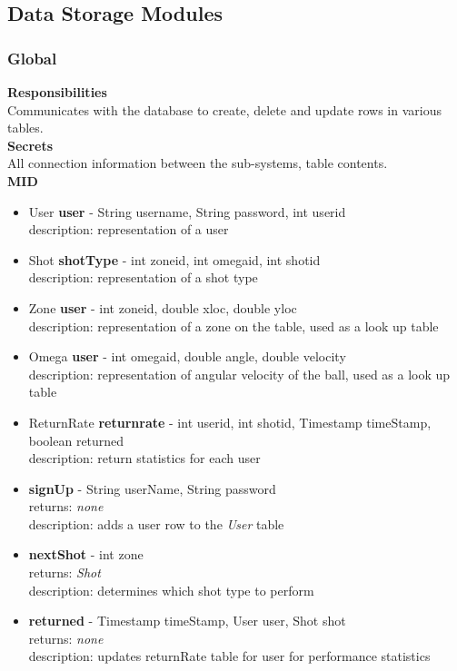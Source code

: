 \documentclass[11pt]{article}
\begin{document}
\subsection{Data Storage Modules}
\subsubsection*{Global}
\textbf{Responsibilities} \\
Communicates with the database to create, delete and update rows in various tables.  \\
\textbf{Secrets} \\
All connection information between the sub-systems, table contents.\\
\textbf{MID} \\
\begin{itemize}
\item User \textbf{user} - String user\textunderscore name, String password, int user\textunderscore id \\ description: representation of a user
\item Shot \textbf{shotType} - int zone\textunderscore id, int omega\textunderscore id, int shot\textunderscore id \\ description: representation of a shot type
\item Zone \textbf{user} -  int zone\textunderscore id, double x\textunderscore loc, double y\textunderscore loc \\ description: representation of a zone on the table, used as a look up table
\item Omega \textbf{user} - int omega\textunderscore id, double angle, double velocity \\ description: representation of angular velocity of the ball, used as a look up table
\item ReturnRate \textbf{return\textunderscore rate} - int user\textunderscore id, int shot\textunderscore id,  Timestamp timeStamp, boolean returned \\ description: return statistics for each user
\item \textbf{signUp} - String userName, String password \\ returns: \textit{none} \\ description: adds a user row to the \textit{User} table
\item \textbf{nextShot} - int zone \\ returns: \textit{Shot} \\ description: determines which shot type to perform
\item \textbf{returned} - Timestamp timeStamp, User user, Shot shot \\ returns: \textit{none} \\ description: updates returnRate table for user for performance statistics
\end{itemize}
\end{document}
